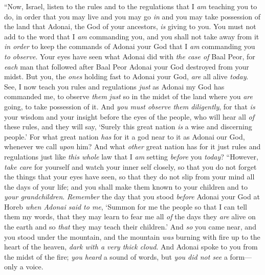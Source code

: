 \begin{biblechapter} %
 “Now, Israel, listen to the rules and to the regulations that I \textit{am} teaching you to do, in order that you may live and you may go \textit{in} and you may take possession of the land that Adonai, the God of your ancestors, \textit{is} giving to you.
\verse You must not add to the word that I \textit{am} commanding you, and you shall not take away from it \textit{in order} to keep the commands of Adonai your God that I \textit{am} commanding you \textit{to observe}.
\verse Your eyes have seen what Adonai did with \textit{the case of} Baal Peor, for \textit{each} man that followed after Baal Peor Adonai your God destroyed from your midst.
\verse But you, the \textit{ones} holding fast to Adonai your God, \textit{are} all alive \textit{today}.
\verse See, I now teach you rules and regulations \textit{just} as Adonai my God has commanded me, to observe \textit{them} \textit{just} so in the midst of the land where you \textit{are} going, to take possession of it.
\verse And \textit{you must observe them diligently}, for that \textit{is} your wisdom and your insight before the eyes of the people, who will hear all \textit{of} these rules, and they will say, ‘Surely this great nation \textit{is} a wise and discerning people.’
\verse For what great nation \textit{has} for it a god near to it as Adonai our God, whenever we call \textit{upon} him?
\verse And what \textit{other} great nation has for it just rules and regulations just like \textit{this whole} law that I \textit{am} setting \textit{before} you \textit{today}?
\verse “However, \textit{take care} for yourself and watch your inner self closely, so that you do not forget the things that your eyes have seen, so that they do not slip from your mind all the days of your life; and you shall make them known to your children and to \textit{your grandchildren}.
\verse \textit{Remember} the day that you stood \textit{before} Adonai your God at Horeb \textit{when Adonai said to me}, ‘Summon for me the people so that I can tell them my words, that they may learn to fear me all \textit{of} the days they \textit{are} alive on the earth and so \textit{that} they may teach their children.’
\verse And \textit{so} you came near, and you stood under the mountain, and the mountain \textit{was} burning with fire up to the heart of the heaven, \textit{dark with a very thick cloud}.
\verse And Adonai spoke to you from the midst of the fire; \textit{you heard} a sound of words, but \textit{you did not see} a form—only a voice.

\end{biblechapter}
